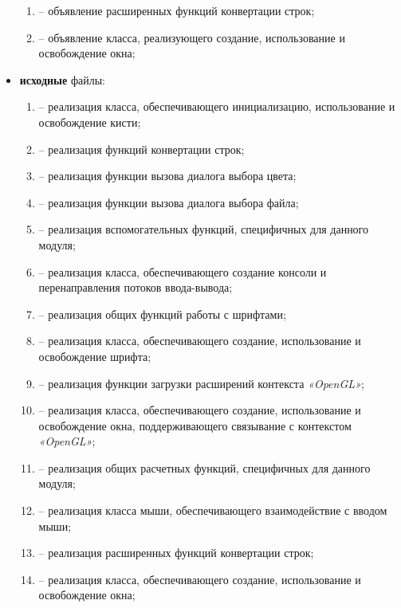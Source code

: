 \begin{itemize}[label=---]
\begin{enumerate}[label=\arabic*), labelsep=0.5em]
        \item {} -- объявление расширенных функций конвертации строк;
        \item {} -- объявление класса, реализующего создание, использование и освобождение окна;
    \end{enumerate}
    \item \textbf{исходные} файлы:
    \begin{enumerate}[label=\arabic*), labelsep=0.5em]
        \item {} -- реализация класса, обеспечивающего инициализацию, использование и освобождение кисти;
        \item {} -- реализация функций конвертации строк;
        \item {} -- реализация функции вызова диалога выбора цвета;
        \item {} -- реализация функции вызова диалога выбора файла;
        \item {} -- реализация вспомогательных функций, специфичных для данного модуля;
        \item {} -- реализация класса, обеспечивающего создание консоли и перенаправления потоков ввода-вывода;
        \item {} -- реализация общих функций работы с шрифтами;
        \item {} -- реализация класса, обеспечивающего создание, использование и освобождение шрифта;
        \item {} -- реализация функции загрузки расширений контекста \textit{«OpenGL»};
        \item {} -- реализация класса, обеспечивающего создание, использование и освобождение окна, поддерживающего связывание с контекстом \textit{«OpenGL»}; 
        \item {} -- реализация общих расчетных функций, специфичных для данного модуля;
        \item {} -- реализация класса мыши, обеспечивающего взаимодействие с вводом мыши;
        \item {} -- реализация расширенных функций конвертации строк;
        \item {} -- реализация класса, обеспечивающего создание, использование и освобождение окна;
    \end{enumerate}
\end{itemize}

